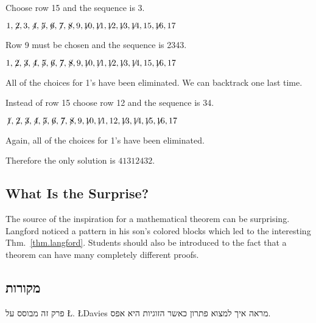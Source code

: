 \noindent Choose row 15 and the sequence is \textvisiblespace{}3.

$1,\not\! 2,3,\not\! 4,\not\! 5,\not\! 6,\not\! 7,\not\! 8,9,\not\!\! 10,\not\!\! 11,\not\!\! 12,\not\!\! 13,\not\!\! 14,15,\not\!\! 16,17$

\noindent Row 9 must be chosen and the sequence is 2{}34{}3.

$1,\not\! 2,\not\! 3,\not\! 4,\not\! 5,\not\! 6,\not\! 7,\not\! 8,9,\not\!\! 10,\not\!\! 11,\not\!\! 12,\not\!\! 13,\not\!\! 14,15,\not\!\! 16,17$

\noindent All of the choices for 1's have been eliminated. We can backtrack one last time. 

\smallskip

\noindent Instead of row 15 choose row 12 and the sequence is 3{}4\textvisiblespace {}.

$\not\! 1,\not\! 2,\not\! 3,\not\! 4,\not\! 5,\not\! 6,\not\! 7,\not\! 8,9,\not\!\! 10,\not\!\! 11,12,\not\!\! 13,\not\!\! 14,\not\!\! 15,\not\!\! 16,17$

\noindent Again, all of the choices for 1's have been eliminated.

\medskip

\noindent Therefore the only solution is $41312432$.

\subsection*{What Is the Surprise?}

The source of the inspiration for a mathematical theorem can be surprising. Langford noticed a pattern in his son's colored blocks which led to the interesting Thm.~\ref{thm.langford}. Students should also be introduced to the fact that a theorem  can have many completely different proofs.

\subsection*{מקורות}
פרק זה מבוסס על
\L{\cite{miller}}.
\L{Davies}
מראה איך למצוא פתרון כאשר הזוגיות היא אפס.
